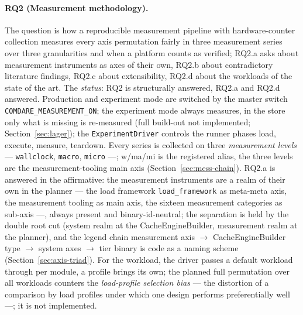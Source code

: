 \begin{nurkurz}
\paragraph{RQ2 (Measurement methodology).} The question is how a reproducible measurement pipeline with
hardware-counter collection measures every axis permutation fairly in three measurement series over three
granularities and when a platform counts as verified; RQ2.a asks about measurement instruments as axes of
their own, RQ2.b about contradictory literature findings, RQ2.c about extensibility, RQ2.d about the
workloads of the state of the art. The \emph{status}: RQ2 is structurally answered, RQ2.a and RQ2.d
answered. Production and experiment mode are switched by the master switch
\texttt{COMDARE\_\allowbreak{}MEASUREMENT\_\allowbreak{}ON}; the experiment mode always measures, in the
store only what is missing is re-measured (full build-out not implemented; Section~\ref{sec:lager}); the
\texttt{ExperimentDriver} controls the runner phases load, execute, measure, teardown. Every series is
collected on three \emph{measurement levels} --- \texttt{wallclock}, \texttt{macro}, \texttt{micro} ---;
w/ma/mi is the registered alias, the three levels are the measurement-tooling main axis
(Section~\ref{sec:mess-chain}). RQ2.a is answered in the affirmative: the measurement instruments are a
realm of their own in the planner --- the load framework \texttt{load\_framework} as meta-meta axis, the
measurement tooling as main axis, the sixteen measurement categories as sub-axis ---, always present and
binary-id-neutral; the separation is held by the double root cut (system realm at the CacheEngineBuilder,
measurement realm at the planner), and the legend chain measurement axis $\to$ CacheEngineBuilder type
$\to$ system axes $\to$ tier binary is code as a naming scheme (Section~\ref{sec:axis-triad}). For the
workload, the driver passes a default workload through per module, a profile brings its own; the planned
full permutation over all workloads counters the \emph{load-profile selection bias} --- the distortion of a
comparison by load profiles under which one design performs preferentially
well~\cite{blackburn2006dacapo,blackburn2016truth,mytkowicz2009wrongdata} ---; it is not implemented.
\end{nurkurz}

